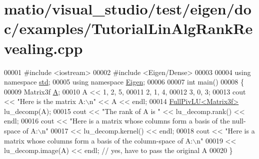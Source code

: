 \hypertarget{matio_2visual__studio_2test_2eigen_2doc_2examples_2_tutorial_lin_alg_rank_revealing_8cpp_source}{}\section{matio/visual\+\_\+studio/test/eigen/doc/examples/\+Tutorial\+Lin\+Alg\+Rank\+Revealing.cpp}
\label{matio_2visual__studio_2test_2eigen_2doc_2examples_2_tutorial_lin_alg_rank_revealing_8cpp_source}

\begin{DoxyCode}
00001 \textcolor{preprocessor}{#include <iostream>}
00002 \textcolor{preprocessor}{#include <Eigen/Dense>}
00003 
00004 \textcolor{keyword}{using namespace }\hyperlink{namespacestd}{std};
00005 \textcolor{keyword}{using namespace }\hyperlink{namespace_eigen}{Eigen};
00006 
00007 \textcolor{keywordtype}{int} main()
00008 \{
00009    Matrix3f \hyperlink{group___core___module_class_eigen_1_1_matrix}{A};
00010    A << 1, 2, 5,
00011         2, 1, 4,
00012         3, 0, 3;
00013    cout << \textcolor{stringliteral}{"Here is the matrix A:\(\backslash\)n"} << A << endl;
00014    \hyperlink{group___l_u___module_class_eigen_1_1_full_piv_l_u}{FullPivLU<Matrix3f>} lu\_decomp(A);
00015    cout << \textcolor{stringliteral}{"The rank of A is "} << lu\_decomp.rank() << endl;
00016    cout << \textcolor{stringliteral}{"Here is a matrix whose columns form a basis of the null-space of A:\(\backslash\)n"}
00017         << lu\_decomp.kernel() << endl;
00018    cout << \textcolor{stringliteral}{"Here is a matrix whose columns form a basis of the column-space of A:\(\backslash\)n"}
00019         << lu\_decomp.image(A) << endl; \textcolor{comment}{// yes, have to pass the original A}
00020 \}
\end{DoxyCode}
